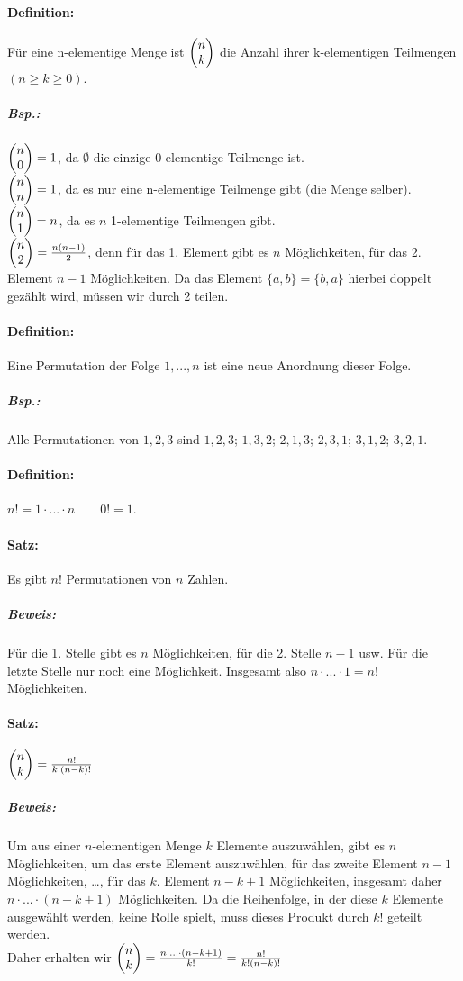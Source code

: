 \paragraph{Definition:} Für eine n-elementige Menge ist $\begin{pmatrix}n\\k\end{pmatrix}$ die Anzahl ihrer k-elementigen Teilmengen $(n\geq k \geq 0)$.

\subparagraph{Bsp.:} \parskp
$\begin{pmatrix}n\\0\end{pmatrix}=1$, da $\emptyset$ die einzige 0-elementige Teilmenge ist.\\
$\begin{pmatrix}n\\n\end{pmatrix}=1$, da es nur eine n-elementige Teilmenge gibt (die Menge selber).\\
$\begin{pmatrix}n\\1\end{pmatrix}=n$, da es $n$ 1-elementige Teilmengen gibt.\\
$\begin{pmatrix}n\\2\end{pmatrix}=\frac{n(n-1)}{2}$, denn für das 1. Element gibt es $n$ Möglichkeiten, für das 2. Element $n-1$ Möglichkeiten. Da das Element $\{a,b\}=\{b,a\}$ hierbei doppelt gezählt wird, müssen wir durch 2 teilen.

\paragraph{Definition:} Eine Permutation der Folge $1,...,n$ ist eine neue Anordnung dieser Folge.

\subparagraph{Bsp.:} Alle Permutationen von $1,2,3$ sind $1,2,3$; $1,3,2$; $2,1,3$; $2,3,1$; $3,1,2$; $3,2,1$.

\paragraph{Definition:} $n!=1\cdot ... \cdot n \qquad 0! =1$.
\paragraph{Satz:} Es gibt $n!$ Permutationen von $n$ Zahlen.

\subparagraph{Beweis:} Für die 1. Stelle gibt es $n$ Möglichkeiten, für die 2. Stelle $n-1$ usw. Für die letzte Stelle nur noch eine Möglichkeit. Insgesamt also $n\cdot ... \cdot 1=n!$ Möglichkeiten.

\paragraph{Satz:} $\begin{pmatrix}n\\k\end{pmatrix}= \frac{n!}{k! (n-k)!}$
\subparagraph{Beweis:} Um aus einer $n$-elementigen Menge $k$ Elemente auszuwählen, gibt es $n$ Möglichkeiten, um das erste Element auszuwählen, für das zweite Element $n-1$ Möglichkeiten, …, für das $k$. Element $n-k+1$ Möglichkeiten, insgesamt daher $n \cdot ...\cdot (n-k+1)$ Möglichkeiten. Da die Reihenfolge, in der diese $k$ Elemente ausgewählt werden, keine Rolle spielt, muss dieses Produkt durch $k!$ geteilt werden. \\
Daher erhalten wir $\begin{pmatrix}n\\k\end{pmatrix}= \frac{n\cdot ...\cdot (n-k+1)}{k!}= \frac{n!}{k! (n-k)!}$

